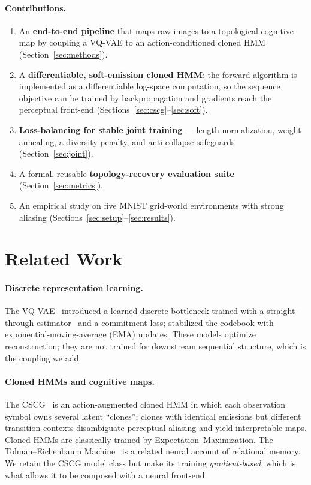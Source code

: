 \documentclass[twocolumn,10pt]{article}
\begin{document}
\paragraph{Contributions.}
\begin{enumerate}
  \item An \textbf{end-to-end pipeline} that maps raw images to a topological
        cognitive map by coupling a VQ-VAE to an action-conditioned cloned
        HMM (Section~\ref{sec:methods}).
  \item A \textbf{differentiable, soft-emission cloned HMM}: the forward
        algorithm is implemented as a differentiable log-space computation,
        so the sequence objective can be trained by backpropagation and
        gradients reach the perceptual front-end
        (Sections~\ref{sec:cscg}--\ref{sec:soft}).
  \item \textbf{Loss-balancing for stable joint training} --- length
        normalization, weight annealing, a diversity penalty, and
        anti-collapse safeguards (Section~\ref{sec:joint}).
  \item A formal, reusable \textbf{topology-recovery evaluation suite}
        (Section~\ref{sec:metrics}).
  \item An empirical study on five MNIST grid-world environments with strong
        aliasing (Sections~\ref{sec:setup}--\ref{sec:results}).
\end{enumerate}

\section{Related Work}
\label{sec:related}

\paragraph{Discrete representation learning.}
The VQ-VAE~\cite{oord2017} introduced a learned discrete bottleneck trained
with a straight-through estimator~\cite{bengio2013} and a commitment loss;
\cite{razavi2019} stabilized the codebook with exponential-moving-average
(EMA) updates. These models optimize reconstruction; they are not trained for
downstream sequential structure, which is the coupling we add.

\paragraph{Cloned HMMs and cognitive maps.}
The CSCG~\cite{george2021} is an action-augmented cloned HMM in which each
observation symbol owns several latent ``clones''; clones with identical
emissions but different transition contexts disambiguate perceptual aliasing
and yield interpretable maps. Cloned HMMs are classically trained by
Expectation--Maximization. The Tolman--Eichenbaum Machine~\cite{whittington2020}
is a related neural account of relational memory. We retain the CSCG model
class but make its training \emph{gradient-based}, which is what allows it to
be composed with a neural front-end.
\end{document}
